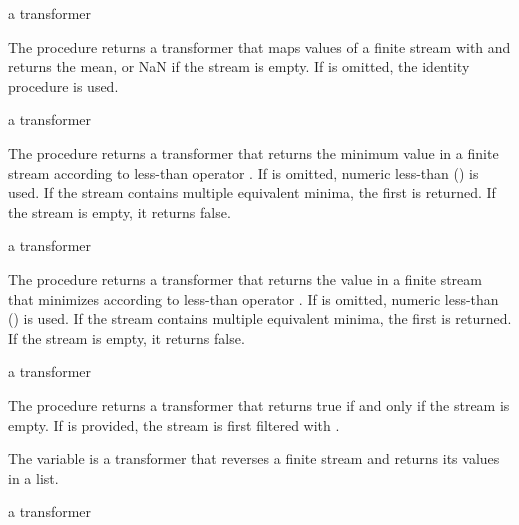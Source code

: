 \begin{procedure}
\end{procedure}
\returns{} a transformer

The  procedure returns a transformer that maps values of a finite stream with
 and returns the mean, or NaN if the stream is empty. If  is
omitted, the identity procedure is used.

\begin{procedure}
\end{procedure}
\returns{} a transformer

The  procedure returns a transformer that returns the minimum value in a
finite stream according to less-than operator . If  is omitted, numeric
less-than (\code{<}) is used. If the stream contains multiple equivalent minima, the first
is returned. If the stream is empty, it returns false.

\begin{procedure}
\end{procedure}
\returns{} a transformer

The  procedure returns a transformer that returns the value  in a
finite stream that minimizes  according to less-than
operator . If  is omitted, numeric less-than (\code{<}) is used. If the
stream contains multiple equivalent minima, the first is returned. If the stream is empty,
it returns false.

\begin{procedure}
\end{procedure}
\returns{} a transformer

The  procedure returns a transformer that returns true if and only if
the stream is empty. If  is provided, the stream is first filtered
with .

\begin{variable}
\end{variable}
\antipar

The  variable is a transformer that reverses a finite stream and returns
its values in a list.

\begin{procedure}
\end{procedure}
\returns{} a transformer


